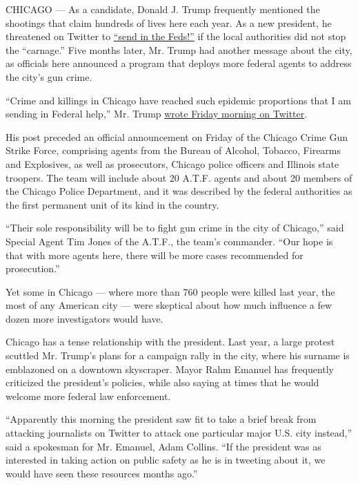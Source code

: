 CHICAGO --- As a candidate, Donald J. Trump frequently mentioned the
shootings that claim hundreds of lives here each year. As a new
president, he threatened on Twitter to
\href{https://twitter.com/realdonaldtrump/status/824080766288228352?lang=en}{``send
in the Feds!''} if the local authorities did not stop the ``carnage.''
Five months later, Mr. Trump had another message about the city, as
officials here announced a program that deploys more federal agents to
address the city's gun crime.

``Crime and killings in Chicago have reached such epidemic proportions
that I am sending in Federal help,'' Mr. Trump
\href{https://twitter.com/realDonaldTrump/status/880739852286918656}{wrote
Friday morning on Twitter}.

His post preceded an official announcement on Friday of the Chicago
Crime Gun Strike Force, comprising agents from the Bureau of Alcohol,
Tobacco, Firearms and Explosives, as well as prosecutors, Chicago police
officers and Illinois state troopers. The team will include about 20
A.T.F. agents and about 20 members of the Chicago Police Department, and
it was described by the federal authorities as the first permanent unit
of its kind in the country.

``Their sole responsibility will be to fight gun crime in the city of
Chicago,'' said Special Agent Tim Jones of the A.T.F., the team's
commander. ``Our hope is that with more agents here, there will be more
cases recommended for prosecution.''

Yet some in Chicago --- where more than 760 people were killed last
year, the most of any American city --- were skeptical about how much
influence a few dozen more investigators would have.

Chicago has a tense relationship with the president. Last year, a large
protest scuttled Mr. Trump's plans for a campaign rally in the city,
where his surname is emblazoned on a downtown skyscraper. Mayor Rahm
Emanuel has frequently criticized the president's policies, while also
saying at times that he would welcome more federal law enforcement.

``Apparently this morning the president saw fit to take a brief break
from attacking journalists on Twitter to attack one particular major
U.S. city instead,'' said a spokesman for Mr. Emanuel, Adam Collins.
``If the president was as interested in taking action on public safety
as he is in tweeting about it, we would have seen these resources months
ago.''

